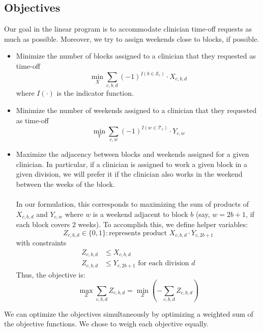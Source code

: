 \documentclass[]{article}
\newcommand{\mc}{\mathcal}
\begin{document}
\subsection{Objectives} \label{objectives}
Our goal in the linear program is to accommodate clinician time-off requests as much as possible. Moreover, we try to assign weekends close to blocks, if possible.
	\begin{itemize}
		\item Minimize the number of blocks assigned to a clinician that they requested as time-off
			\begin{equation}
				\label{eqn_block_obj}
				\min_X \sum_{c, b, d} (-1)^{ I(b \in \mc{S}_c) } \cdot X_{c, b, d}
			\end{equation}
		where $I(\cdot)$ is the indicator function.
		\item Minimize the number of weekends assigned to a clinician that they requested as time-off
			\begin{equation}
				\label{eqn_weekend_obj}
				\min_Y \sum_{c, w} (-1)^{ I (w \in \mc{T}_c)} \cdot Y_{c, w}
			\end{equation}
		\item Maximize the adjacency between blocks and weekends assigned for a given clinician. In particular, if a clinician is assigned to work a given block in a given division, we will prefer it if the clinician also works in the weekend between the weeks of the block. \\ \\
		In our formulation, this corresponds to maximizing the sum of products of $X_{c, b, d}$ and $Y_{c, w}$ where $w$ is a weekend adjacent to block $b$ (say, $w = 2b+1$, if each block covers 2 weeks). To accomplish this, we define helper variables:
			\begin{equation}
				Z_{c, b, d} \in \{0, 1\} : \text{represents product $X_{c, b, d}\cdot Y_{c, 2b+1}$}
			\end{equation}
		with constraints
			\begin{align}
				Z_{c, b, d} &\leq X_{c, b, d} \\
				Z_{c, b, d} &\leq Y_{c, 2b+1} \text{ for each division $d$}
			\end{align}
		Thus, the objective is:
			\begin{equation}
				\label{eqn_adjacency_obj}
				\max_Z \sum_{c, b, d} Z_{c, b, d} = \min_Z \left(- \sum_{c, b, d} Z_{c, b, d}\right)
			\end{equation}
	\end{itemize}	

We can optimize the objectives simultaneously by optimizing a weighted sum of the objective functions. We chose to weigh each objective equally.
\end{document}
